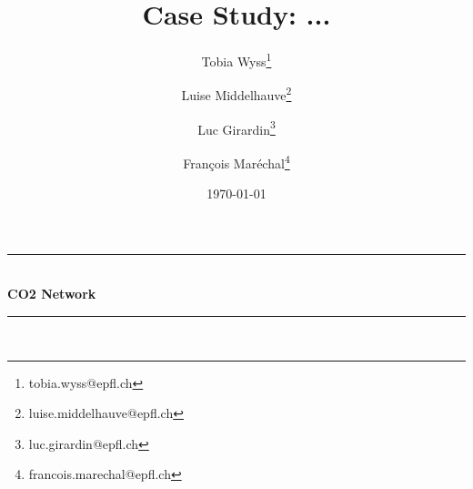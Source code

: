 
\begin{titlepage}

\newcommand{\HRule}{\rule{\linewidth}{0.5mm}} %
\begin{center}{
\HRule \\[0.4cm] 
\huge \bfseries{CO2 Network}
\HRule \\[0.5cm]}
\end{center}

\title{Case Study: ...}

\author[2]{Tobia Wyss\thanks{tobia.wyss@epfl.ch}}

\author[1]{Luise Middelhauve\thanks{luise.middelhauve@epfl.ch}}
\author[1]{Luc Girardin\thanks{luc.girardin@epfl.ch}}
\author[1]{Fran\c{c}ois Mar\'echal\thanks{francois.marechal@epfl.ch}}




 

\date{\today} %
{\let\newpage\relax\maketitle}
\vspace*{\fill}

\begin{figure*}[!htb]
\centering
{}\hfill
\quad
{}
\end{figure*}

\thispagestyle{postprintnote}

\end{titlepage}





